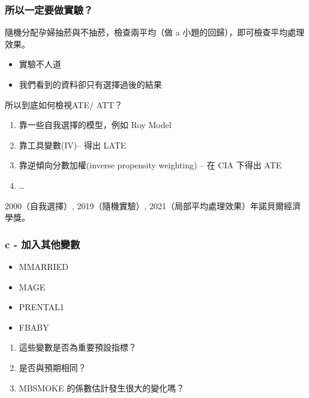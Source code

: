 \begin{frame}
    \frametitle{所以一定要做實驗？}

    隨機分配孕婦抽菸與不抽菸，檢查兩平均（做 a 小題的回歸），即可檢查平均處理效果。

    \begin{itemize}
        \item 實驗不人道
        \item 我們看到的資料卻只有選擇過後的結果
    \end{itemize}
    
    所以到底如何檢視ATE/ ATT？
    \begin{enumerate}
        \item 靠一些自我選擇的模型，例如 Roy Model
        \item 靠工具變數(IV)-- 得出 LATE 
        \item 靠逆傾向分數加權(inverse propensity weighting) -- 在 CIA 下得出 ATE
        \item \dots
    \end{enumerate}

    2000（自我選擇）, 2019（隨機實驗）, 2021（局部平均處理效果）年諾貝爾經濟學獎。
\end{frame}

\begin{frame}
    \frametitle{ c - 加入其他變數}
    \begin{itemize}
        \item MMARRIED
        \item MAGE
        \item PRENTAL1
        \item FBABY
    \end{itemize}

    \begin{enumerate}
        \item 這些變數是否為重要預設指標？
        \item 是否與預期相同？
        \item MBSMOKE 的係數估計發生很大的變化嗎？
    \end{enumerate}

\end{frame}


